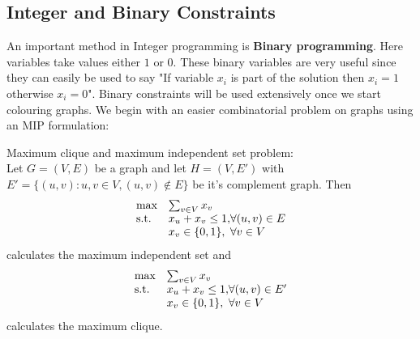\subsection{Integer and Binary Constraints}
An important method in Integer programming is \textbf{Binary programming}. Here variables take values either $1$ or $0$. These binary variables are very useful since they can easily be used to say "If variable $x_i$ is part of the solution then $x_i = 1$ otherwise $x_i = 0$". Binary constraints will be used extensively once we start colouring graphs. We begin with an easier combinatorial problem on graphs using an MIP formulation:
\begin{example}\label{independent set}
Maximum clique and maximum independent set problem:\\
Let $G=(V,E)$ be a graph and let $H=(V,E')$ with $E' = \{(u,v):u,v\in V, (u,v) \notin E\}$ be it's complement graph. Then
\begin{align}
\begin{array}{ll@{}ll}
\text{max} &\sum_{v\in V} x_v&\\
\text{s.t.} &x_u + x_v \leq 1,& \forall (u,v) \in E\\
&x_v\in\{0,1\},& \forall v \in V\\
\end{array}
\end{align}
calculates the maximum independent set and
\begin{align}
\begin{array}{ll@{}ll}
\text{max} &\sum_{v\in V} x_v&\\
\text{s.t.} &x_u + x_v \leq 1,& \forall (u,v) \in E'\\
&x_v\in\{0,1\},& \forall v \in V\\
\end{array}
\end{align}
calculates the maximum clique.
\begin{figure}[H]
\centering
{}
\end{figure}
\end{example}

